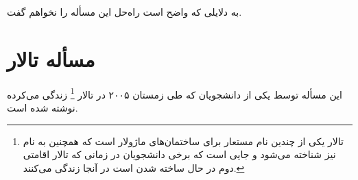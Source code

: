 \documentclass{book}
\begin{document}
    به دلایلی که واضح است راه‌حل این مسأله را نخواهم گفت. 


\section{مسأله تالار  }

    این مسأله توسط  یکی از دانشجویان  که طی زمستان ۲۰۰۵ در تالار \footnote{
    تالار  یکی از چندین نام مستعار برای ساختمان‌های ماژولار است که همچنین به نام  نیز شناخته می‌شود و جایی است که 
    برخی دانشجویان در زمانی که تالار اقامتی دوم در حال ساخته شدن است در آنجا زندگی می‌کنند. 
    } زندگی می‌کرده نوشته شده است. 
\end{document}
